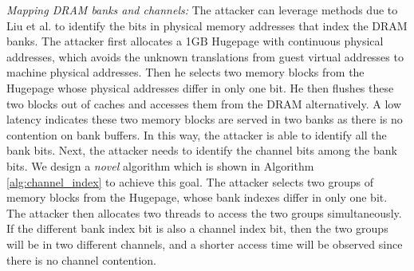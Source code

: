 \documentclass{sig-alternate}
\newcommand{\gbytes}{\ensuremath{\mathrm{GB}}\xspace}
\begin{document}
{\em Mapping DRAM banks and channels:} The attacker can leverage methods due to Liu et al. \cite{LiCuXi:12} to identify the bits in physical memory addresses that index the DRAM banks. The attacker first allocates a 1\gbytes Hugepage with continuous physical addresses, which avoids the unknown translations from guest virtual addresses to machine physical addresses. Then he selects two memory blocks from the Hugepage whose physical addresses differ in only one bit. He then flushes these two blocks out of caches and accesses them from the DRAM alternatively. A low latency indicates these two memory blocks are served in two banks as there is no contention on bank buffers. In this way, the attacker is able to identify all the bank bits. Next, the attacker needs to identify the channel bits among the bank bits. We design a \textit{novel} algorithm which is shown in Algorithm \ref{alg:channel_index} to achieve this goal. The attacker selects two groups of memory blocks from the Hugepage, whose bank indexes differ in only one bit. The attacker then allocates two threads to access the two groups simultaneously. If the different bank index bit is also a channel index bit, then the two groups will be in two different channels, and a shorter access time will be observed since there is no channel contention. 
\end{document}
